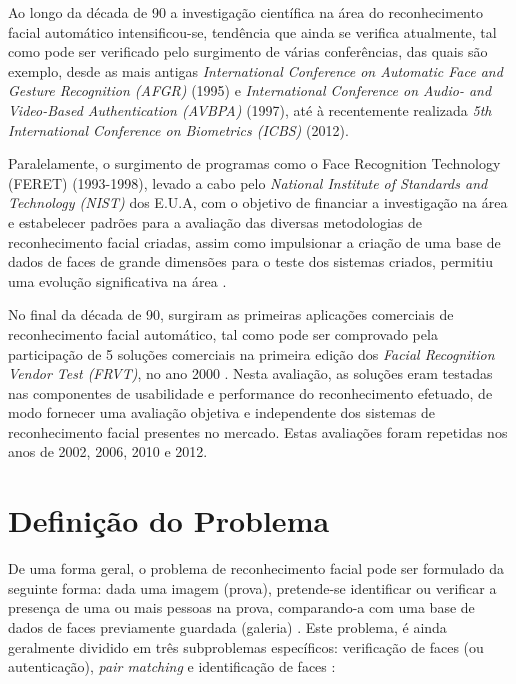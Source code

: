 Ao longo da década de 90 a investigação científica na área do reconhecimento facial automático intensificou-se, tendência que ainda se verifica atualmente, tal como pode ser verificado pelo surgimento de várias conferências, das quais são exemplo, desde as mais antigas
\textit{International Conference on Automatic Face and Gesture Recognition (AFGR)} (1995) e \textit{International Conference on Audio- and Video-Based Authentication (AVBPA)} (1997), até à recentemente realizada \textit{5th International Conference on Biometrics (ICBS)} (2012).

Paralelamente, o surgimento de programas como o Face Recognition Technology (FERET) (1993-1998), levado a cabo pelo \textit{National Institute of Standards and Technology (NIST)} dos E.U.A, com o objetivo de financiar a investigação na área e estabelecer padrões para a avaliação das diversas metodologias de reconhecimento facial criadas, assim como impulsionar a criação de uma base de dados de faces de grande dimensões para o teste dos sistemas criados, permitiu uma evolução significativa na área \cite{Phillips1998, Phillips2000}.

No final da década de 90, surgiram as primeiras aplicações comerciais de reconhecimento facial automático, tal como pode ser comprovado  pela participação de 5 soluções comerciais na primeira edição dos \textit{Facial Recognition Vendor Test (FRVT)}, no ano 2000 \cite{BlackburnDuaneM.;BoneMike;Phillips2001}. Nesta avaliação, as soluções eram testadas nas componentes de usabilidade e performance do reconhecimento efetuado, de modo fornecer uma avaliação objetiva e independente dos sistemas de reconhecimento facial presentes no mercado. Estas avaliações foram repetidas nos anos de 2002, 2006, 2010 e 2012.

\section{Definição do Problema} \label{sec:problema}
De uma forma geral, o problema de reconhecimento facial pode ser formulado da seguinte forma: dada uma imagem (prova), pretende-se identificar ou verificar a presença de uma ou mais pessoas na prova, comparando-a com uma base de dados de faces previamente guardada (galeria) \cite{Yang2002, Zhao2003}. Este problema, é ainda geralmente dividido em três subproblemas específicos: verificação de faces (ou autenticação), \textit{pair matching} e identificação de faces \cite{Li2011, Huang2007}:

